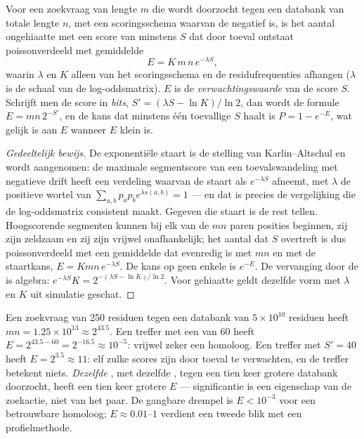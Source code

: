 \begin{theorem}\label{thm:b3:bioinformatics:evalue}
Voor een zoekvraag van lengte $m$ die wordt doorzocht tegen een
databank van totale lengte $n$, met een scoringsschema waarvan de
 negatief is, is het aantal ongehiaatte  met een score van minstens $S$ dat door toeval ontstaat
poissonverdeeld met gemiddelde
\[
E = K\,m\,n\,e^{-\lambda S},
\]
waarin $\lambda$ en $K$ alleen van het scoringsschema en de
residufrequenties afhangen ($\lambda$ is de schaal van de
log-oddsmatrix). $E$ is de \emph{verwachtingswaarde} van de score $S$.
Schrijft men de score in \emph{bits}, $S' = (\lambda S - \ln K)/\ln 2$,
dan wordt de formule $E = m n\, 2^{-S'}$, en de kans dat minstens één
toevallige  $S$ haalt is $P = 1 - e^{-E}$, wat gelijk is aan
$E$ wanneer $E$ klein is.
\end{theorem}
\begin{proof}[Gedeeltelijk bewijs]
De exponentiële staart is de stelling van Karlin--Altschul en wordt
aangenomen: de maximale segmentscore van een toevalswandeling met
negatieve drift heeft een verdeling waarvan de staart als
$e^{-\lambda S}$ afneemt, met $\lambda$ de positieve wortel van
$\sum_{a,b} p_{a} p_{b} e^{\lambda s(a,b)} = 1$ --- en dat is precies
de vergelijking die de log-oddsmatrix consistent maakt. Gegeven die
staart is de rest tellen. Hoogscorende segmenten kunnen bij elk van de
$mn$ paren posities beginnen, zij zijn zeldzaam en zij zijn vrijwel
onafhankelijk; het aantal dat $S$ overtreft is dus poissonverdeeld met
een gemiddelde dat evenredig is met $mn$ en met de staartkans,
$E = Kmn\,e^{-\lambda S}$. De kans op geen enkele is $e^{-E}$. De
vervanging door de  is algebra: $e^{-\lambda S} K = 2^{-(\lambda S -
\ln K)/\ln 2}$. Voor gehiaatte  geldt dezelfde vorm met
$\lambda$ en $K$ uit simulatie geschat.
\end{proof}

\begin{example}\label{ex:b3:bioinformatics:evalue}
Een zoekvraag van \num{250} residuen tegen een databank van
$5\times 10^{10}$ residuen heeft $mn = 1.25\times 10^{13} \approx 2^{43.5}$.
Een treffer met een  van $60$ heeft
$E = 2^{43.5 - 60} = 2^{-16.5} \approx 10^{-5}$: vrijwel zeker een
homoloog. Een treffer met $S' = 40$ heeft $E = 2^{3.5}
\approx 11$: elf zulke scores zijn door toeval te verwachten, en de
treffer betekent niets. \emph{Dezelfde} , met dezelfde
, tegen een tien keer grotere databank doorzocht, heeft een
tien keer grotere $E$ --- significantie is een eigenschap van de
zoekactie, niet van het paar. De gangbare drempel is $E < 10^{-3}$ voor
een betrouwbare homoloog; $E \approx 0.01$--$1$ verdient een tweede
blik met een profielmethode.
\end{example}

